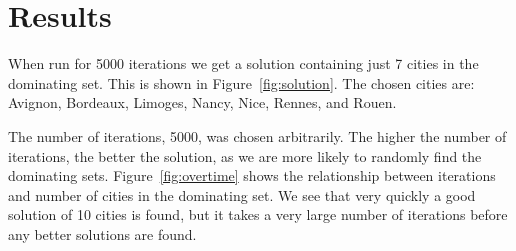 \documentclass{article}
\begin{document}
\section{Results}
When run for 5000 iterations we get a solution containing just 7 cities in the dominating set. This is shown in Figure~\ref{fig:solution}. The chosen cities are: Avignon, Bordeaux, Limoges, Nancy, Nice, Rennes, and Rouen.

The number of iterations, 5000, was chosen arbitrarily. The higher the number of iterations, the better the solution, as we are more likely to randomly find the dominating sets. Figure~\ref{fig:overtime} shows the relationship between iterations and number of cities in the dominating set. We see that very quickly a good solution of 10 cities is found, but it takes a very large number of iterations before any better solutions are found.
\end{document}
